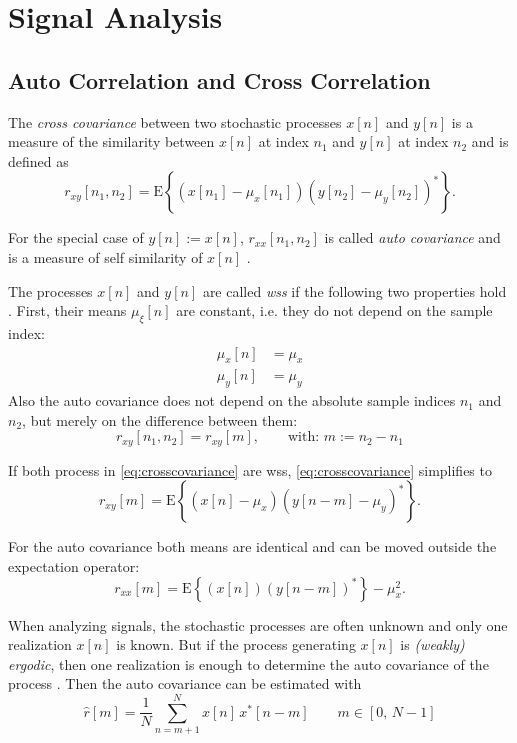 \section{Signal Analysis}
\subsection{Auto Correlation and Cross Correlation}
The \textit{cross covariance} between two stochastic processes $x[n]$ and $y[n]$ is a measure of the similarity between $x[n]$ at index $n_1$ and $y[n]$ at index $n_2$ and is defined as
\begin{equation}\label{eq:crosscovariance}
r_{xy}[n_1,n_2] = \text{E}\left\{(x[n_1]-\mu_x[n_1])(y[n_2]-\mu_y[n_2])^\ast\right\}.
\end{equation}

For the special case of $y[n]:=x[n]$, $r_{xx}[n_1,n_2]$ is called \textit{auto covariance} and is a measure of self similarity of $x[n]$ \cite[p.~172]{Park2017}.

The processes $x[n]$ and $y[n]$ are called \textit{\gls{wss}} if the following two properties hold \cite[p.~167]{Park2017}. 
First, their means $\mu_{\xi}[n]$ are constant, i.e. they do not depend on the sample index:
\begin{align}
\mu_{x}[n] &= \mu_x\\
\mu_{y}[n] &= \mu_y
\end{align}
Also the auto covariance does not depend on the absolute sample indices $n_1$ and $n_2$, but merely on the difference between them:
\begin{equation}
r_{xy}[n_1,n_2] = r_{xy}[m],\qquad \text{with: } m:=n_2-n_1
\end{equation}

If both process in \autoref{eq:crosscovariance} are \gls{wss}, \autoref{eq:crosscovariance} simplifies to
\begin{equation}
r_{xy}[m] = \text{E}\left\{(x[n]-\mu_x)(y[n-m]-\mu_y)^\ast\right\}.
\end{equation}

For the auto covariance both means are identical and can be moved outside the expectation operator:
\begin{equation}
r_{xx}[m] = \text{E}\left\{(x[n])(y[n-m])^\ast\right\}-\mu_{x}^2.
\end{equation}

When analyzing signals, the stochastic processes are often unknown and only one realization $x[n]$ is known. But if the process generating $x[n]$ is \textit{(weakly) ergodic}, then one realization is enough to determine the auto covariance of the process \cite[p.~252]{Puente2019}.
Then the auto covariance can be estimated with
\begin{equation}\label{eq:autocovarianveEstimation}
\hat{r}[m] = \frac{1}{N} \sum_{n=m+1}^{N} x[n]\,x^\ast[n-m]\qquad m \in [0,\,N-1]
\end{equation} 


